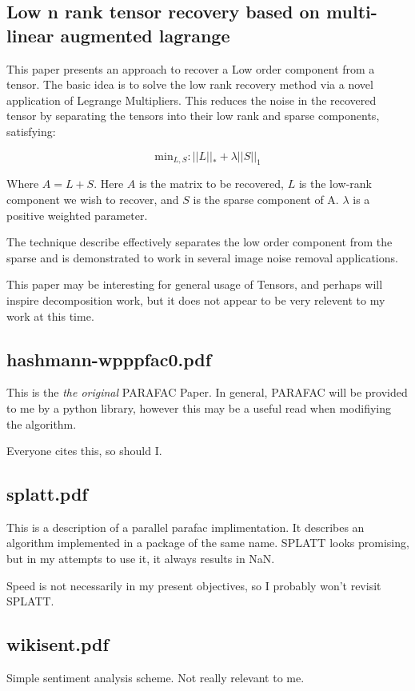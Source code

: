 \documentclass{article}
\begin{document}
\subsection{Low n rank tensor recovery based on multi-linear augmented lagrange}

This paper presents an approach to recover a Low order component from a tensor.  The basic idea is to solve the low rank recovery method via a novel 
application of Legrange Multipliers.  This reduces the noise in the 
recovered tensor by separating the tensors into their low rank and sparse components, satisfying:

\[
\mathrm{min}_{L,S} : ||L||_* + \lambda ||S||_1 
\]

Where $A=L+S$.  Here $A$ is the matrix to be recovered, $L$ is the low-rank 
component we wish to recover, and $S$ is the sparse component of A.  $\lambda$ is a positive weighted parameter.

The technique describe effectively separates the low order component from
the sparse and is demonstrated to work in several image noise removal
applications.

This paper may be interesting for general usage of Tensors, and perhaps
will inspire decomposition work, but it does not appear to be very relevent
to my work at this time.

\subsection{hashmann-wpppfac0.pdf}
This is the {\em the original} PARAFAC Paper.  In general, PARAFAC will be
provided to me by a python library, however this may be a useful read 
when modifiying the algorithm.

Everyone cites this, so should I.

\subsection{splatt.pdf}
This is a description of a parallel parafac implimentation.  It describes
an algorithm implemented in a package of the same name.   SPLATT looks 
promising, but in my attempts to use it, it always results in NaN.

Speed is not necessarily in my present objectives, so I probably won't
revisit SPLATT.

\subsection{wikisent.pdf}
Simple sentiment analysis scheme.  Not really relevant to me.
\end{document}
